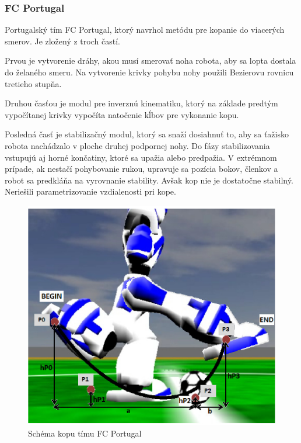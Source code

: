 \subsubsection{FC Portugal} \label{fc_portugal}

Portugalský tím FC Portugal\cite{fc_portugal}, ktorý navrhol metódu pre kopanie do viacerých smerov. Je zložený z troch častí. 

Prvou je vytvorenie dráhy, akou musí smerovať noha robota, aby sa lopta dostala do želaného smeru. Na vytvorenie krivky pohybu nohy použili Bezierovu rovnicu tretieho stupňa. 

Druhou časťou je modul pre inverznú kinematiku, ktorý na základe predtým vypočítanej krivky vypočíta natočenie kĺbov pre vykonanie kopu. 

Posledná časť je stabilizačný modul, ktorý sa snaží dosiahnuť to, aby sa ťažisko robota nachádzalo v ploche druhej podpornej nohy. Do fázy stabilizovania vstupujú aj horné končatiny, ktoré sa upažia alebo predpažia. V extrémnom prípade, ak nestačí pohybovanie rukou, upravuje sa pozícia bokov, členkov a robot sa predkláňa na vyrovnanie stability. Avšak kop nie je dostatočne stabilný. Neriešili parametrizovanie vzdialenosti pri kope.

\begin{figure}[H]
	\center
	\includegraphics[scale=1]{./data/kick_arch_fc_portugal}
	\caption{Schéma kopu tímu FC Portugal \cite{fc_portugal}}
	\label{pic_kick_arch_fc_portugal}
\end{figure}


